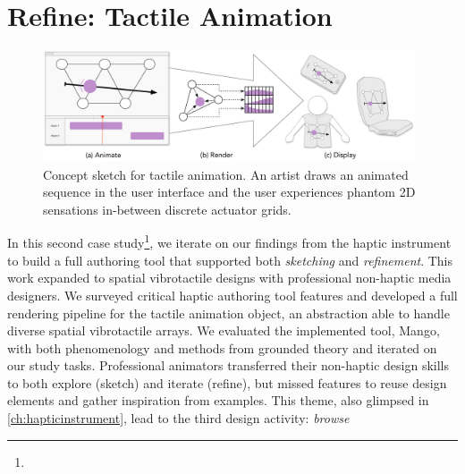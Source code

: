 

\newcommand{\qq}[2]{\emph{``#1"} (#2)}
\newcommand{\HAtheme}[2]{\textbf{Theme #1:} \uline{#2}\\}



\chapter{Refine: Tactile Animation}
\label{ch:tactileanimation}

\begin{figure}[h]
   \includegraphics[width=0.98\textwidth]{images/HA14-Concept-Sketch-2015-01-17-1127}
   \caption{Concept sketch for tactile animation. 
An artist draws an animated sequence in the user interface and the user experiences phantom 2D sensations in-between discrete actuator grids. 
}
   \label{fig:concept:sketch}
\end{figure}

  

\noindent
{} In this second case study\footnote{}, we iterate on our findings from the haptic instrument to build a full authoring tool that supported both \emph{sketching} and \emph{refinement}.
This work expanded to spatial vibrotactile designs with professional non-haptic media designers.
We surveyed critical haptic authoring tool features and developed a full rendering pipeline for the tactile animation object, an abstraction able to handle diverse spatial vibrotactile arrays. %
We evaluated the implemented tool, Mango, with both phenomenology and methods from grounded theory and iterated on our study tasks.
Professional animators transferred their non-haptic design skills to both explore (sketch) and iterate (refine), but missed features to reuse design elements and gather inspiration from examples.
This theme, also glimpsed in \autoref{ch:hapticinstrument}, lead to the third design activity: \emph{browse}

